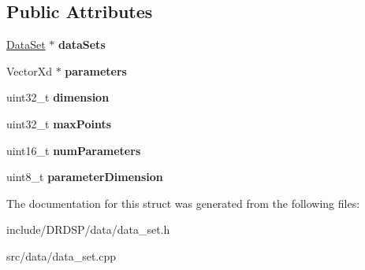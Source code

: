 \subsection*{Public Attributes}
\begin{DoxyCompactItemize}
\item 
\hypertarget{struct_d_r_d_s_p_1_1_data_system_a67957644fe1a286de4d9ad2dec06b972}{\hyperlink{struct_d_r_d_s_p_1_1_data_set}{Data\-Set} $\ast$ {\bfseries data\-Sets}}\label{struct_d_r_d_s_p_1_1_data_system_a67957644fe1a286de4d9ad2dec06b972}

\item 
\hypertarget{struct_d_r_d_s_p_1_1_data_system_adfbfe0987e15a40aa9a39987937ca337}{Vector\-Xd $\ast$ {\bfseries parameters}}\label{struct_d_r_d_s_p_1_1_data_system_adfbfe0987e15a40aa9a39987937ca337}

\item 
\hypertarget{struct_d_r_d_s_p_1_1_data_system_ab6aefaa08cd0a5b6a9e83105ecd56289}{uint32\-\_\-t {\bfseries dimension}}\label{struct_d_r_d_s_p_1_1_data_system_ab6aefaa08cd0a5b6a9e83105ecd56289}

\item 
\hypertarget{struct_d_r_d_s_p_1_1_data_system_a3e5fe0e180799a6251dfd66b4a2cd49c}{uint32\-\_\-t {\bfseries max\-Points}}\label{struct_d_r_d_s_p_1_1_data_system_a3e5fe0e180799a6251dfd66b4a2cd49c}

\item 
\hypertarget{struct_d_r_d_s_p_1_1_data_system_ab6c8c9e69467d53990254ecdcbf5e073}{uint16\-\_\-t {\bfseries num\-Parameters}}\label{struct_d_r_d_s_p_1_1_data_system_ab6c8c9e69467d53990254ecdcbf5e073}

\item 
\hypertarget{struct_d_r_d_s_p_1_1_data_system_ae4c6d5195272938097c0f9b01c18b4e0}{uint8\-\_\-t {\bfseries parameter\-Dimension}}\label{struct_d_r_d_s_p_1_1_data_system_ae4c6d5195272938097c0f9b01c18b4e0}

\end{DoxyCompactItemize}


The documentation for this struct was generated from the following files\-:\begin{DoxyCompactItemize}
\item 
include/\-D\-R\-D\-S\-P/data/data\-\_\-set.\-h\item 
src/data/data\-\_\-set.\-cpp\end{DoxyCompactItemize}
